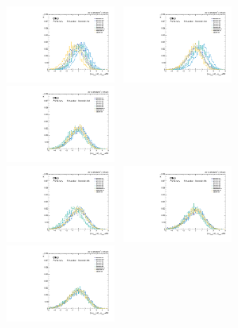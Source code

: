 \begin{figure}[p]
  \centering
  \includegraphics[width=0.32\textwidth]{Fig/BiasStudy/Pull/ZJpsiG_Cat3/pull_fitfunc0_leastbias}~
  \includegraphics[width=0.32\textwidth]{Fig/BiasStudy/Pull/ZJpsiG_Cat3/pull_fitfunc1_leastbias}~
  \includegraphics[width=0.32\textwidth]{Fig/BiasStudy/Pull/ZJpsiG_Cat3/pull_fitfunc2_leastbias}\\
  \includegraphics[width=0.32\textwidth]{Fig/BiasStudy/Pull/ZJpsiG_Cat3/pull_fitfunc3_leastbias}~
  \includegraphics[width=0.32\textwidth]{Fig/BiasStudy/Pull/ZJpsiG_Cat3/pull_fitfunc4_leastbias}~
  \includegraphics[width=0.32\textwidth]{Fig/BiasStudy/Pull/ZJpsiG_Cat3/pull_fitfunc5_leastbias}\\

\end{figure}
